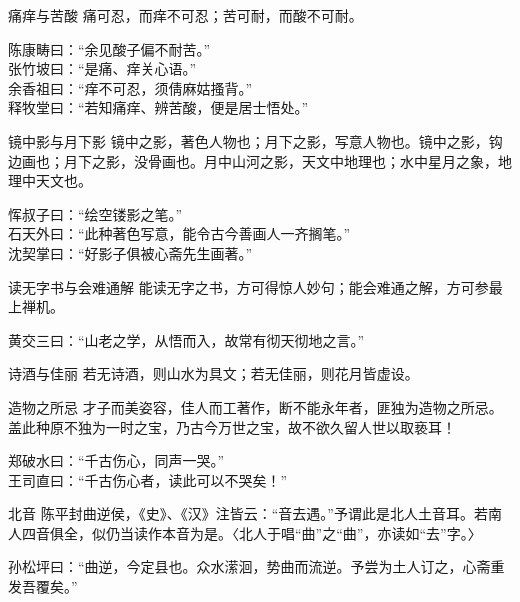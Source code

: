 \begin{yulu}{痛痒与苦酸}
痛可忍，而痒不可忍；苦可耐，而酸不可耐。
\begin{comments}
陈康畴曰：“余见酸子偏不耐苦。” \\
张竹坡曰：“是痛、痒关心语。” \\
余香祖曰：“痒不可忍，须倩麻姑搔背。” \\
释牧堂曰：“若知痛痒、辨苦酸，便是居士悟处。”
\end{comments}
\end{yulu}

\begin{yulu}{镜中影与月下影}
镜中之影，著色人物也；月下之影，写意人物也。镜中之影，钩边画也；月下之影，没骨画也。月中山河之影，天文中地理也；水中星月之象，地理中天文也。
\begin{comments}
恽叔子曰：“绘空镂影之笔。” \\
石天外曰：“此种著色写意，能令古今善画人一齐搁笔。” \\
沈契掌曰：“好影子俱被心斋先生画著。”
\end{comments}
\end{yulu}

\begin{yulu}{读无字书与会难通解}
能读无字之书，方可得惊人妙句；能会难通之解，方可参最上禅机。
\begin{comments}
黄交三曰：“山老之学，从悟而入，故常有彻天彻地之言。”
\end{comments}
\end{yulu}

\begin{yulu}{诗酒与佳丽}
若无诗酒，则山水为具文；若无佳丽，则花月皆虚设。
\begin{comments}

\end{comments}
\end{yulu}

\begin{yulu}{造物之所忌}
才子而美姿容，佳人而工著作，断不能永年者，匪独为造物之所忌。盖此种原不独为一时之宝，乃古今万世之宝，故不欲久留人世以取亵耳！
\begin{comments}
郑破水曰：“千古伤心，同声一哭。” \\
王司直曰：“千古伤心者，读此可以不哭矣！”
\end{comments}
\end{yulu}

\begin{yulu}{北音}
陈平封曲逆侯，《史》、《汉》注皆云：“音去遇。”予谓此是北人土音耳。若南人四音俱全，似仍当读作本音为是。〈北人于唱“曲”之“曲”，亦读如“去”字。〉
\begin{comments}
孙松坪曰：“曲逆，今定县也。众水潆洄，势曲而流逆。予尝为土人订之，心斋重发吾覆矣。”
\end{comments}
\end{yulu}

